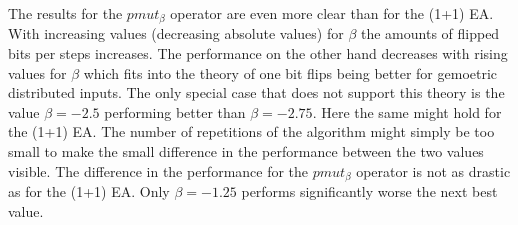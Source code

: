 The results for the $pmut_\beta$ operator are even more clear than for the (1+1) EA.
With increasing values (decreasing absolute values) for $\beta$ the amounts of flipped bits per steps increases.
The performance on the other hand decreases with rising values for $\beta$ which fits into the theory of one bit flips being better for gemoetric distributed inputs.
The only special case that does not support this theory is the value $\beta=-2.5$ performing better than $\beta=-2.75$.
Here the same might hold for the (1+1) EA.
The number of repetitions of the algorithm might simply be too small to make the small difference in the performance between the two values visible.
The difference in the performance for the $pmut_\beta$ operator is not as drastic as for the (1+1) EA.
Only $\beta=-1.25$ performs significantly worse the next best value.



